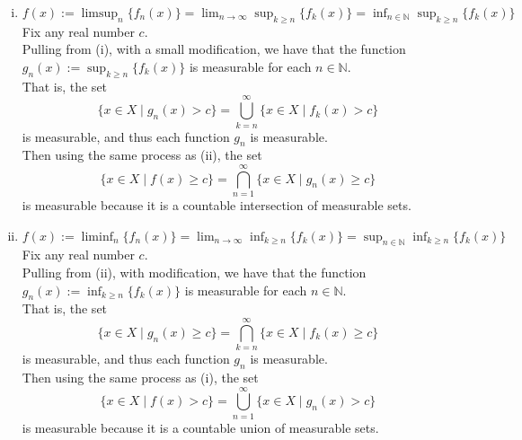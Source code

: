 \begin{enumerate}
\begin{enumerate}[(i)]
        \item $f(x):=\limsup_n\{f_n(x)\}=\lim_{n\to\infty}\sup_{k\ge n}\{f_k(x)\}=\inf_{n\in\mathbb{N}}\sup_{k\ge n}\{f_k(x)\}$
        \\Fix any real number $c$.
        \\Pulling from (i), with a small modification, we have that the function $g_n(x):=\sup_{k\ge n}\{f_k(x)\}$ is measurable for each $n\in\mathbb{N}$.
        \\That is, the set
        \[
            \{x\in X\mid g_n(x)> c\}=\bigcup_{k=n}^\infty\{x\in X\mid f_k(x)> c\}
        \]
        is measurable, and thus each function $g_n$ is measurable.
        \\Then using the same process as (ii), the set
        \[
            \{x\in X\mid f(x)\ge c\}=\bigcap_{n=1}^\infty\{x\in X\mid g_n(x)\ge c\}%
        \]
        is measurable because it is a countable intersection of measurable sets.
        \item $f(x):=\liminf_n\{f_n(x)\}=\lim_{n\to\infty}\inf_{k\ge n}\{f_k(x)\}=\sup_{n\in\mathbb{N}}\inf_{k\ge n}\{f_k(x)\}$
        \\Fix any real number $c$.
        \\Pulling from (ii), with modification, we have that the function $g_n(x):=\inf_{k\ge n}\{f_k(x)\}$ is measurable for each $n\in\mathbb{N}$.
        \\That is, the set
        \[
            \{x\in X\mid g_n(x)\ge c\}=\bigcap_{k=n}^\infty\{x\in X\mid f_k(x)\ge c\}
        \]
        is measurable, and thus each function $g_n$ is measurable.
        \\Then using the same process as (i), the set
        \[
            \{x\in X\mid f(x)> c\}=\bigcup_{n=1}^\infty\{x\in X\mid g_n(x)> c\}%
        \]
        is measurable because it is a countable union of measurable sets.


\end{enumerate}
\end{enumerate}
